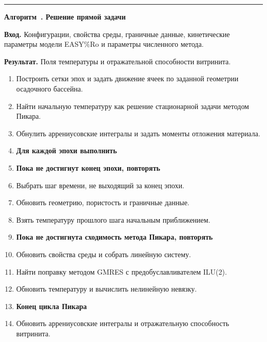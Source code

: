 \bigskip
\noindent\begin{minipage}{\linewidth}
\hrule
\medskip
{}\label{alg:forward}
\textbf{Алгоритм~\thereportalgorithm. Решение прямой задачи}

\smallskip
\textbf{Вход.} Конфигурации, свойства среды, граничные данные, кинетические параметры модели EASY\%Ro и параметры численного метода.

\textbf{Результат.} Поля температуры и отражательной способности витринита.

\begin{enumerate}
\setlength{\itemsep}{0pt}
\setlength{\parsep}{0pt}
\item Построить сетки эпох и задать движение ячеек по заданной геометрии осадочного бассейна.
\item Найти начальную температуру как решение стационарной задачи методом Пикара.
\item Обнулить аррениусовские интегралы и задать моменты отложения материала.
\item \textbf{Для каждой эпохи выполнить}
\item \hspace*{1em}\textbf{Пока не достигнут конец эпохи, повторять}
\item \hspace*{2em}Выбрать шаг времени, не выходящий за конец эпохи.
\item \hspace*{2em}Обновить геометрию, пористость и граничные данные.
\item \hspace*{2em}Взять температуру прошлого шага начальным приближением.
\item \hspace*{2em}\textbf{Пока не достигнута сходимость метода Пикара, повторять}
\item \hspace*{3em}Обновить свойства среды и собрать линейную систему.
\item \hspace*{3em}Найти поправку методом GMRES с предобуславливателем ILU(2).
\item \hspace*{3em}Обновить температуру и вычислить нелинейную невязку.
\item \hspace*{2em}\textbf{Конец цикла Пикара}
\item \hspace*{2em}Обновить аррениусовские интегралы и отражательную способность витринита.

\end{enumerate}
\end{minipage}
